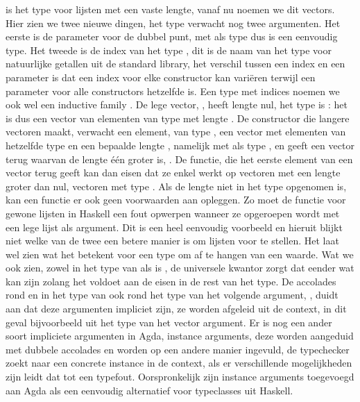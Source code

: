  is het type voor lijsten met een vaste lengte, vanaf nu noemen we
dit vectors. Hier zien we twee nieuwe dingen, het type  verwacht nog
twee argumenten. Het eerste is de parameter voor de dubbel punt,  met
als type  dus  is een eenvoudig type. Het tweede is de
index van het type , dit is de naam van het type voor natuurlijke
getallen uit de standard library, het verschil tussen een index en een
parameter is dat een index voor elke constructor kan variëren terwijl een
parameter voor alle constructors hetzelfde is. Een type met indices noemen we
ook wel een inductive family \cite{indfam}. De lege vector, \iagda{[]}, heeft
lengte nul, het type is : het is dus een vector van elementen
van type  met lengte . De constructor die langere vectoren
maakt, verwacht een element,  van type , een vector met
elementen van hetzelfde type  en een bepaalde lengte ,
namelijk  met als type , en geeft een vector terug
waarvan de lengte één groter is, . De 
functie, die het eerste element van een vector terug geeft kan dan eisen dat ze
enkel werkt op vectoren met een lengte groter dan nul, vectoren met type
. Als de lengte niet in het type opgenomen is, kan een
functie er ook geen voorwaarden aan opleggen. Zo moet de  functie
voor gewone lijsten in Haskell een fout opwerpen wanneer ze opgeroepen wordt
met een lege lijst als argument.  Dit is een heel eenvoudig voorbeeld en
hieruit blijkt niet welke van de twee een betere manier is om lijsten voor te
stellen.  Het laat wel zien wat het betekent voor een type om af te hangen van
een waarde. Wat we ook zien, zowel in het type van  als 
is , de universele kwantor zorgt dat  eender wat kan zijn
zolang het voldoet aan de eisen in de rest van het type. De accolades rond
 en in het type van  ook rond het type van het volgende
argument, , duidt aan dat deze argumenten impliciet zijn, ze
worden afgeleid uit de context, in dit geval bijvoorbeeld uit het type van het
vector argument. Er is nog een ander soort impliciete argumenten in Agda,
instance arguments, deze worden aangeduid met dubbele accolades en worden op
een andere manier ingevuld, de typechecker zoekt naar een concrete instance in
de context, als er verschillende mogelijkheden zijn leidt dat tot een typefout.
Oorspronkelijk zijn instance arguments toegevoegd aan Agda als een eenvoudig
alternatief voor typeclasses uit Haskell.

